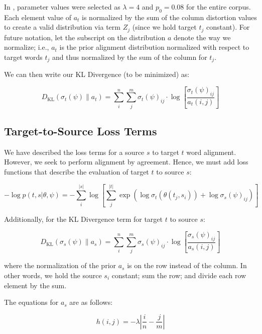 \documentclass[twoside,twocolumn]{article}
\newlength\mystoreparindent
\newenvironment{myparindent}[1]{%
  \setlength{\mystoreparindent}{\the\parindent}
  \setlength{\parindent}{#1}
  }{%
  \setlength{\parindent}{\mystoreparindent}
}
\begin{document}
\begin{myparindent}{0pt}
In \cite{dyer2013simple}, parameter values were selected as
$\lambda = 4$ and $p_0 = 0.08$ for the entire corpus.
Each element value of $a_t$ is normalized by the sum of the column distortion
values to create a valid distribution via term $Z_j$
(since we hold target $t_j$ constant). For future notation, let the subscript
on the distribution $a$ denote the way we normalize; i.e., $a_t$ is the
prior alignment distribution normalized with respect to target
words $t_j$ and thus normalized by the sum of the column for $t_j$.

We can then write our KL Divergence (to be minimized) as:

\begin{equation}
  D_{\mathrm{KL}}(\sigma_t(\psi) \| a_t) =
    \sum_i^n \sum_j^m \sigma_t(\psi)_{ij} \cdot
      \log \left[ \frac{\sigma_t(\psi)_{ij}}{a_t(i, j)} \right]
\end{equation}


\subsection{Target-to-Source Loss Terms}

We have described the loss terms for a source $s$ to target $t$ word alignment.
However, we seek to perform alignment by agreement. Hence, we must add loss
functions that describe the evaluation of target $t$ to source $s$:

\begin{equation}
  -\log  p(t , s | \theta, \psi) =
  - \sum_i^{|s|}  \log \left[ \sum_j^{|t|}
      \exp \left(
        \log \sigma_t(\theta(t_j, s_i)) + \log \sigma_s(\psi)_{ij}
      \right)
    \right]
\end{equation}

\noindent
Additionally, for the KL Divergence term for target $t$ to source $s$:

\begin{equation}
D_{\mathrm{KL}} (\sigma_s(\psi) \| a_s) = \sum_i^n \sum_j^m \sigma_s(\psi)_{ij}
  \cdot \log \left[ \frac{\sigma_s(\psi)_{ij}}{a_s(i, j)} \right]
\end{equation}

\noindent
where the normalization of the prior $a_s$ is on the row instead of the column.
In other words, we hold the source $s_i$ constant; sum the row; and divide each
row element by the sum.

The equations for $a_s$ are as follows:

\begin{equation}
  h(i, j) = {-\lambda \left| \frac{i}{n} - \frac{j}{m}\right|}
\end{equation}


\end{myparindent}
\end{document}
